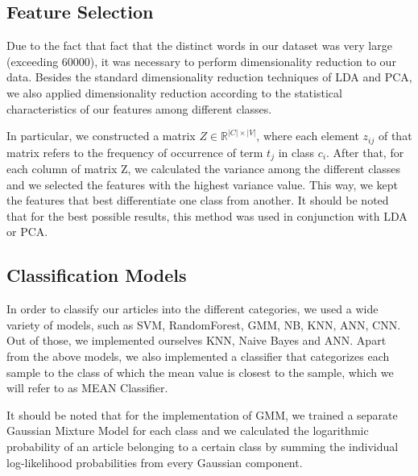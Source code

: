 \documentclass[10pt,journal,compsoc]{IEEEtran}
\begin{document}
\subsection{Feature Selection}
Due to the fact that fact that the distinct
words in our dataset was very large (exceeding 60000),
it was necessary to perform dimensionality reduction 
to our data.
Besides the standard dimensionality reduction techniques
of LDA and PCA, we also applied dimensionality reduction
according to the statistical characteristics of 
our features among different classes.

In particular, we constructed a matrix $Z\in 
\mathbb{R}^{|C|\times |V|}$, where each element
$z_{ij}$ of that matrix refers to the frequency
of occurrence of term $t_j$ in class $c_i$.
After that, for each column of matrix Z, we 
calculated the variance among the different 
classes and we selected the features with 
the highest variance value.
This way, we kept the features that best
differentiate one class from another.
It should be noted that for the best possible
results, this method was used in conjunction with
LDA or PCA.

\subsection{Classification Models}
In order to classify our articles into the different
categories, we used a wide variety of models,
such as SVM, RandomForest, GMM, NB, KNN, ANN, CNN.
Out of those, we implemented ourselves KNN, Naive
Bayes and ANN.
Apart from the above models, we also implemented
a classifier that categorizes each sample to the
class of which the mean value is closest to the
sample, which we will refer to as MEAN Classifier.

It should be noted that for the implementation of
GMM, we trained a separate Gaussian Mixture Model
for each class and we calculated the logarithmic
probability of an article belonging to a certain 
class by summing the individual log-likelihood
probabilities from every Gaussian component.
\end{document}
